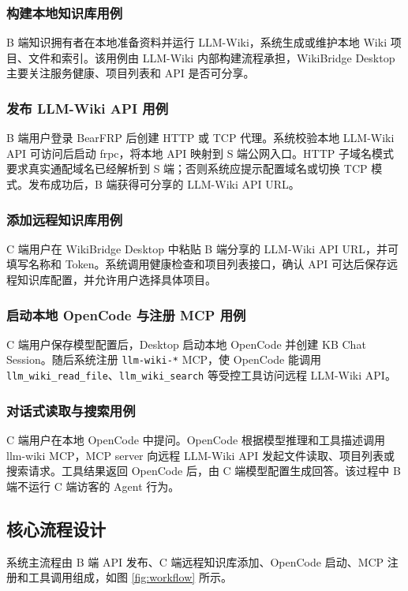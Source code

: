 \documentclass[UTF8,a4paper,12pt,fontset=fandol]{ctexart}
\newcommand{\code}[1]{\texttt{\footnotesize #1}}
\begin{document}
\subsubsection{构建本地知识库用例}
B 端知识拥有者在本地准备资料并运行 LLM-Wiki，系统生成或维护本地 Wiki 项目、文件和索引。该用例由 LLM-Wiki 内部构建流程承担，WikiBridge Desktop 主要关注服务健康、项目列表和 API 是否可分享。

\subsubsection{发布 LLM-Wiki API 用例}
B 端用户登录 BearFRP 后创建 HTTP 或 TCP 代理。系统校验本地 LLM-Wiki API 可访问后启动 frpc，将本地 API 映射到 S 端公网入口。HTTP 子域名模式要求真实通配域名已经解析到 S 端；否则系统应提示配置域名或切换 TCP 模式。发布成功后，B 端获得可分享的 LLM-Wiki API URL。

\subsubsection{添加远程知识库用例}
C 端用户在 WikiBridge Desktop 中粘贴 B 端分享的 LLM-Wiki API URL，并可填写名称和 Token。系统调用健康检查和项目列表接口，确认 API 可达后保存远程知识库配置，并允许用户选择具体项目。

\subsubsection{启动本地 OpenCode 与注册 MCP 用例}
C 端用户保存模型配置后，Desktop 启动本地 OpenCode 并创建 KB Chat Session。随后系统注册 \code{llm-wiki-*} MCP，使 OpenCode 能调用 \code{llm\_wiki\_read\_file}、\code{llm\_wiki\_search} 等受控工具访问远程 LLM-Wiki API。

\subsubsection{对话式读取与搜索用例}
C 端用户在本地 OpenCode 中提问。OpenCode 根据模型推理和工具描述调用 llm-wiki MCP，MCP server 向远程 LLM-Wiki API 发起文件读取、项目列表或搜索请求。工具结果返回 OpenCode 后，由 C 端模型配置生成回答。该过程中 B 端不运行 C 端访客的 Agent 行为。

\subsection{核心流程设计}
系统主流程由 B 端 API 发布、C 端远程知识库添加、OpenCode 启动、MCP 注册和工具调用组成，如图 \ref{fig:workflow} 所示。
\end{document}
